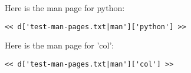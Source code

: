 \documentclass[11pt,a4paper]{article}
\begin{document}
\small

Here is the man page for python:

\tiny
\begin{verbatim}
<< d['test-man-pages.txt|man']['python'] >>
\end{verbatim}
\small

Here is the man page for 'col':

\tiny
\begin{verbatim}
<< d['test-man-pages.txt|man']['col'] >>
\end{verbatim}
\small
\end{document}
